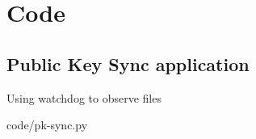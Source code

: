 \chapter{Code}\label{apx:code}

\section{Public Key Sync application}

Using watchdog to observe files

\begin{lstinputlisting}
[language=Python]{code/pk-sync.py}
\end{lstinputlisting}